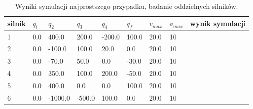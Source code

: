 \documentclass[a4paper, 12pt]{article}
\begin{document}
	\begin{table}[H]
	\centering
	\begin{tabular}{|m{2.5em}|m{3em}|m{3.5em}|m{3em}|m{3em}|m{3em}|m{4em}|m{3em}|m{5em}|}
	\hline
	silnik&$ q_i $ & $ q_2 $ & $ q_3 $ & $q_4$ & $ q_f $ & $ v_{max} $ & $ a_{max} $&wynik symulacji\\
	\hline
	\hline
	\hspace{1em}1& 0.0 & 400.0 & 200.0 & -200.0 & 100.0 & 20.0 & 10&\hspace{2em}\checkmark\\ %
	\hline
	\hspace{1em}2& 0.0 & -100.0 & 100.0 & 20.0 & 0.0 & 20.0 & 10&\hspace{2em}\checkmark\\ %
	\hline
	\hspace{1em}3& 0.0 & -70.0 & 50.0 & 0.0 & -30.0 & 20.0 & 10&\hspace{2em}\checkmark\\ %
	\hline
	\hspace{1em}4& 0.0 & 350.0 & 100.0 & 200.0 & -50.0 & 20.0 & 10&\hspace{2em}\checkmark\\  %
	\hline
	\hspace{1em}5& 0.0 & 400.0 & 0.0 & 0.0 & 100.0 & 20.0 & 10&\hspace{2em}\checkmark\\  %
	\hline
	\hspace{1em}6& 0.0 & -1000.0 & -500.0 & 100.0 & 0.0 & 20.0 & 10&\hspace{2em}\checkmark\\  %
	\hline
	\end{tabular}
	\caption{Wyniki symulacji najprostszego przypadku, badanie oddzielnych silników.}
	\label{tab:setup11}
	\end{table}	
	
\end{document}
